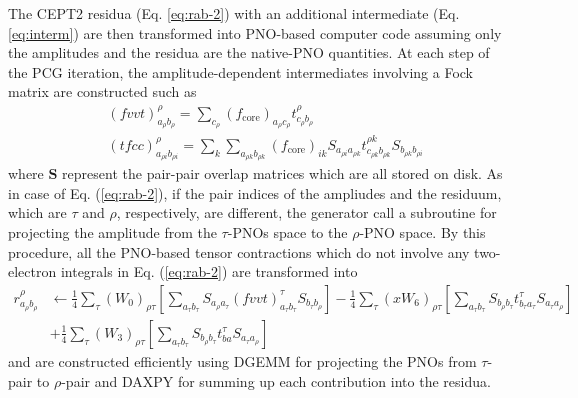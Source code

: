 \documentclass[aip,jcp,amsmath,twocolumn,floatfix,reprint,fleqn]{revtex4-1}
\begin{document}
%
The CEPT2 residua (Eq. \ref{eq:rab-2}) with an additional intermediate (Eq. \ref{eq:interm}) are then transformed into PNO-based computer code assuming only the amplitudes and the residua are the native-PNO quantities.
%
At each step of the PCG iteration, the amplitude-dependent intermediates involving a Fock matrix are constructed such as
%
\begin{align}
  &(fvvt)_{a_{\rho}b_{\rho}}^\rho=\sum_{c_{\rho}} (f_\text{core})_{a_{\rho}c_{\rho}}t_{c_{\rho}b_{\rho}}^\rho \\
  &(tfcc)_{a_{\rho i}b_{\rho i}}^\rho=\sum_{k} \sum_{a_{\rho k}b_{\rho k}} (f_\text{core})_{ik} S_{a_{\rho i}a_{\rho k}}t_{c_{\rho k}b_{\rho k}}^{\rho k} S_{b_{\rho k}b_{\rho i}}
\end{align}
%
where $\mathbf{S}$ represent the pair-pair overlap matrices which are all stored on disk.
%
As in case of Eq. (\ref{eq:rab-2}), if the pair indices of the ampliudes and the residuum, which are $\tau$ and $\rho$, respectively, are different, the generator call a subroutine for projecting the amplitude from the $\tau$-PNOs space to the $\rho$-PNO space.
%
By this procedure, all the PNO-based tensor contractions which do not involve any two-electron integrals in Eq. (\ref{eq:rab-2}) are transformed into
%
\begin{align}
  r_{a_\rho b_\rho}^\rho &\leftarrow \frac{1}{4}\sum_\tau(W_0)_{\rho\tau} \left[\sum_{a_\tau b_\tau} S_{a_\rho a_\tau}(fvvt)_{a_\tau b_\tau}^\tau S_{b_\tau b_\rho}\right] - \frac{1}{4}\sum_\tau (xW_6)_{\rho\tau} \left[\sum_{a_\tau b_\tau} S_{b_\rho b_\tau} t_{b_\tau a_\tau}^\tau S_{a_\tau a_\rho}\right] \nonumber \\
  &+ \frac{1}{4}\sum_\tau (W_3)_{\rho\tau} \left[\sum_{a_\tau b_\tau} S_{b_\rho b_\tau} t_{ba}^\tau S_{a_\tau a_\rho}\right] \label{eq:rab-3}
\end{align}
%
and are constructed efficiently using DGEMM for projecting the PNOs from $\tau$-pair to $\rho$-pair and DAXPY for summing up each contribution into the residua.
\end{document}
